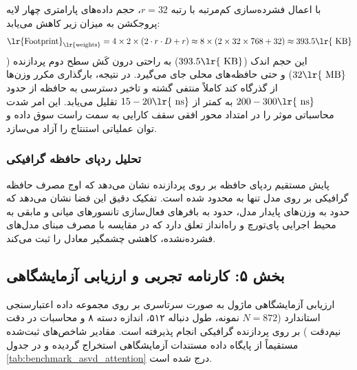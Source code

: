با اعمال فشرده‌سازی کم‌مرتبه  با رتبه $r=32$، حجم داده‌های پارامتری چهار لایه پروجکشن به میزان زیر کاهش می‌یابد:
\begin{equation}
\text{\lr{Footprint}}_{\text{\lr{weights}}} = 4 \times 2 \times \left( 2 \cdot r \cdot D + r \right) \approx 8 \times \left( 2 \times 32 \times 768 + 32 \right) \approx 393.5\text{\lr{ KB}}
\end{equation}
این حجم اندک ($393.5\text{\lr{ KB}}$) به راحتی درون کَش سطح دوم پردازنده ($32\text{\lr{ MB}}$) و حتی حافظه‌های محلی  جای می‌گیرد. در نتیجه، بارگذاری مکرر وزن‌ها از گذرگاه کند  کاملاً منتفی گشته و تاخیر دسترسی به حافظه از حدود $200-300\text{\lr{ ns}}$ به کمتر از $15-20\text{\lr{ ns}}$ تقلیل می‌یابد. این امر شدت محاسباتی موثر را در امتداد محور افقی سقف کارایی به سمت راست سوق داده و توان عملیاتی استنتاج را آزاد می‌سازد.

\subsubsection*{تحلیل ردپای حافظه گرافیکی}
پایش مستقیم ردپای حافظه بر روی پردازنده  نشان می‌دهد که اوج مصرف حافظه گرافیکی  بر روی مدل  تنها به  محدود شده است. تفکیک دقیق این فضا نشان می‌دهد که حدود  به وزن‌های پایدار مدل، حدود  به بافرهای فعال‌سازی تانسورهای میانی و مابقی به محیط اجرایی پای‌تورچ و راه‌انداز  تعلق دارد که در مقایسه با مصرف مبنای  مدل‌های فشرده‌نشده، کاهشی چشمگیر معادل  را ثبت می‌کند.

\subsection*{بخش ۵: کارنامه تجربی و ارزیابی آزمایشگاهی }
ارزیابی آزمایشگاهی ماژول  به صورت سرتاسری بر روی مجموعه داده اعتبارسنجی استاندارد  ($N=872$ نمونه، طول دنباله ۵۱۲، اندازه دسته ۸ و محاسبات در دقت نیم‌دقت ) بر روی پردازنده گرافیکی  انجام پذیرفته است. مقادیر شاخص‌های ثبت‌شده مستقیماً از پایگاه داده مستندات آزمایشگاهی  استخراج گردیده و در جدول \ref{tab:benchmark_asvd_attention} درج شده است.

